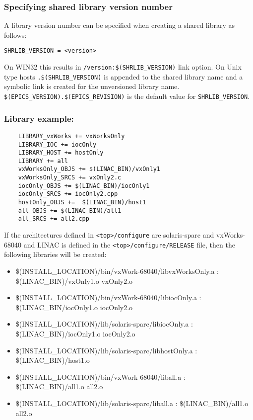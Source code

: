 \subsubsection{Specifying shared library version number}

A library version number can be specified when creating a shared library as follows:

\begin{description}

\item {}\verb|SHRLIB_VERSION = <version>|

\end{description}

On WIN32 this results in \verb|/version:$(SHRLIB_VERSION)| link option. On Unix type hosts \verb|.$(SHRLIB_VERSION)| is 
appended to the shared library name and a symbolic link is created for the unversioned library name. \\
\verb|$(EPICS_VERSION).$(EPICS_REVISION)| is the default value for \verb|SHRLIB_VERSION|.

\subsubsection{Library example:}


\begin{verbatim}
    LIBRARY_vxWorks += vxWorksOnly
    LIBRARY_IOC += iocOnly
    LIBRARY_HOST += hostOnly
    LIBRARY += all
    vxWorksOnly_OBJS += $(LINAC_BIN)/vxOnly1
    vxWorksOnly_SRCS += vxOnly2.c
    iocOnly_OBJS += $(LINAC_BIN)/iocOnly1
    iocOnly_SRCS += iocOnly2.cpp
    hostOnly_OBJS +=  $(LINAC_BIN)/host1
    all_OBJS += $(LINAC_BIN)/all1
    all_SRCS += all2.cpp
\end{verbatim}
If the architectures defined in \verb|<top>/configure| are solaris-sparc and vxWorks-68040 and LINAC is defined in the \verb|<top>/configure/RELEASE| file, then the following libraries will be created:

\begin{itemize}
\item \$(INSTALL\_LOCATION)/bin/vxWork-68040/libvxWorksOnly.a : \$(LINAC\_BIN)/vxOnly1.o vxOnly2.o

\item \$(INSTALL\_LOCATION)/bin/vxWork-68040/libiocOnly.a : \$(LINAC\_BIN/iocOnly1.o iocOnly2.o

\item \$(INSTALL\_LOCATION)/lib/solaris-sparc/libiocOnly.a : \$(LINAC\_BIN)/iocOnly1.o iocOnly2.o

\item \$(INSTALL\_LOCATION)/lib/solaris-sparc/libhostOnly.a : \$(LINAC\_BIN)/host1.o

\item \$(INSTALL\_LOCATION)/bin/vxWork-68040/liball.a : \$(LINAC\_BIN)/all1.o all2.o

\item \$(INSTALL\_LOCATION)/lib/solaris-sparc/liball.a : \$(LINAC\_BIN)/all1.o all2.o

\end{itemize}

